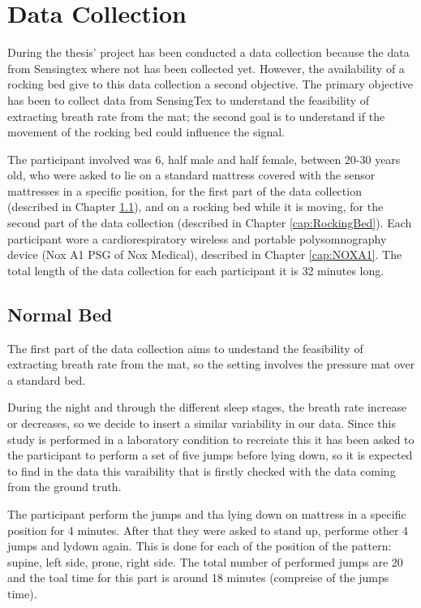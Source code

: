 \section{Data Collection} \label{cap:dataCollection}

During the thesis' project has been conducted a data collection because the data from Sensingtex where not has been collected yet.
However, the availability of a rocking bed give to this data collection a second objective.
The primary objective has been to collect data from SensingTex to understand the feasibility of extracting breath rate from the mat; 
the second goal is to understand if the movement of the rocking bed could influence the signal.

The participant involved was 6, half male and half female, between 20-30 years old, who were asked to lie on a standard mattress covered with the sensor mattresses in a specific position, for the first part of the data collection (described in Chapter \ref{cap:NormalBed}), and on a rocking bed while it is moving, for the second part of the data collection (described in Chapter \ref{cap:RockingBed}).
Each participant wore a cardiorespiratory wireless and portable polysomnography device (Nox A1 PSG of Nox Medical), described in Chapter \ref{cap:NOXA1}. The total length of the data collection for each participant it is 32 minutes long.

\subsection{Normal Bed}\label{cap:NormalBed}
The first part of the data collection aims to undestand the feasibility of extracting breath rate from the mat, so the setting involves the pressure mat over a standard bed.  

During the night and through the different sleep stages, the breath rate increase or decreases, so we decide to insert a similar variability in our data. Since this study is performed in a laboratory condition to recreiate this it has been asked to the participant to perform a set of five jumps before lying down, so it is expected to find in the data this varaibility that is firstly checked with the data coming from the ground truth.

The participant perform the jumps and tha lying down on mattress in a specific position for 4 minutes.
After that they were asked to stand up, performe other 4 jumps and lydown again. This is done for each of the position of the pattern: supine, left side, prone, right side. The total number of performed jumps are 20 and the toal time for this part is around 18 minutes (compreise of the jumps time).
